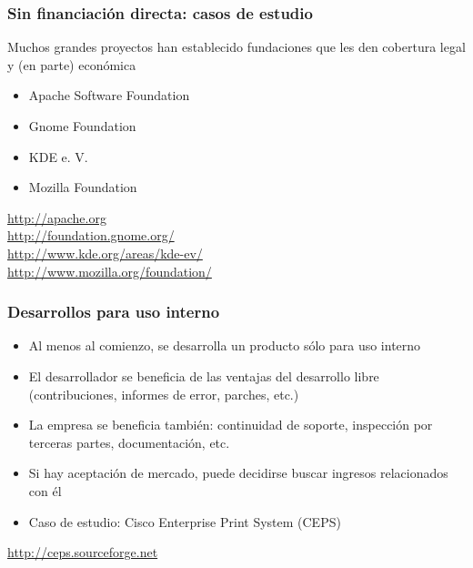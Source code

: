 \begin{frame}
\frametitle{Sin financiación directa: casos de estudio}

Muchos grandes proyectos han establecido fundaciones que les den
cobertura legal y (en parte) económica

\begin{itemize}
\item Apache Software Foundation
\item Gnome Foundation
\item KDE e. V.
\item Mozilla Foundation
\end{itemize}

\begin{flushright}
  \url{http://apache.org} \\
  \url{http://foundation.gnome.org/} \\
  \url{http://www.kde.org/areas/kde-ev/} \\
  \url{http://www.mozilla.org/foundation/}
\end{flushright}

\end{frame}


\begin{frame}
\frametitle{Desarrollos para uso interno}

\begin{itemize}
\item Al menos al comienzo, se desarrolla un producto sólo para uso interno
\item El desarrollador se beneficia de las ventajas del desarrollo
  libre (contribuciones, informes de error, parches, etc.)
\item La empresa se beneficia también: continuidad de soporte,
  inspección por terceras partes, documentación, etc.
\item Si hay aceptación de mercado, puede decidirse buscar ingresos
  relacionados con él
\item Caso de estudio: Cisco Enterprise Print System (CEPS)
\end{itemize}

\begin{flushright}
\url{http://ceps.sourceforge.net}
\end{flushright}
\end{frame}


